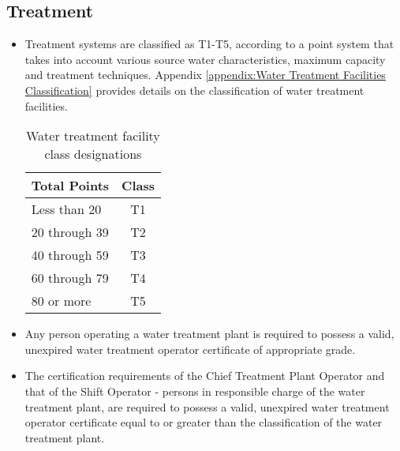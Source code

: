 \subsection{Treatment}
\begin{itemize} 
\item Treatment systems are classified as T1-T5, according to a point system that takes into account various source water characteristics, maximum capacity and treatment techniques. Appendix \ref{appendix:Water Treatment Facilities Classification} provides details on the classification of water treatment facilities.\\
\begin{table}[H]
\begin{center}
\captionsetup{justification=centering}
\begin{tabular}{|l|c|}
\hline
Total Points & Class\\
\hline
Less than 20 & T1\\
\hline
20 through 39 & T2\\
\hline
40 through 59&  T3\\
\hline
60 through 79 & T4\\
\hline
80 or more & T5\\
\hline
\end{tabular}
\caption{Water treatment facility class designations}
\end{center}
\end{table}

\item Any person operating a water treatment plant is required to possess a valid, unexpired water treatment operator certificate of appropriate grade.

\item The certification requirements of the Chief Treatment Plant Operator and that of the Shift Operator - persons  in responsible charge of the water treatment plant,  are required to possess a valid, unexpired water treatment operator certificate equal to or greater than the classification of the water treatment plant.


\end{itemize}
